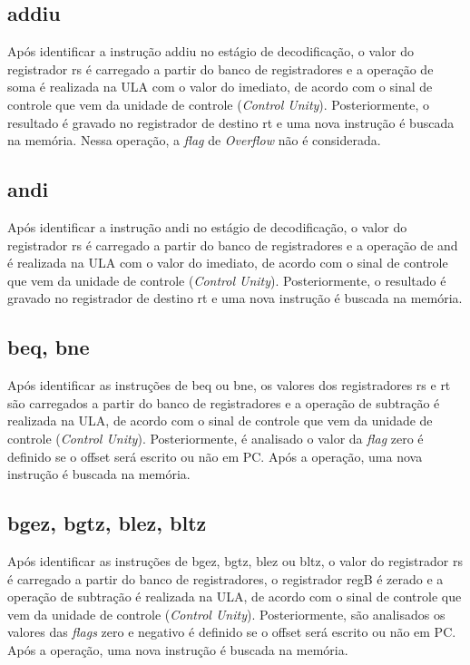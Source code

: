 \documentclass{article}
\begin{document}
    \subsection{addiu}
    Após identificar a instrução addiu no estágio de decodificação, o valor do registrador rs é carregado a partir do banco de registradores e a operação de soma é realizada na ULA com o valor do imediato, de acordo com o sinal de controle que vem da unidade de controle ({\it Control Unity}). Posteriormente, o resultado é gravado no registrador de destino rt e uma nova instrução é buscada na memória. Nessa operação, a {\it flag} de {\it Overflow} não é considerada.
    \\
    \subsection{andi}
    Após identificar a instrução andi no estágio de decodificação, o valor do registrador rs é carregado a partir do banco de registradores e a operação de and é realizada na ULA com o valor do imediato, de acordo com o sinal de controle que vem da unidade de controle ({\it Control Unity}). Posteriormente, o resultado é gravado no registrador de destino rt e uma nova instrução é buscada na memória.

    \subsection{beq, bne}
    Após identificar as instruções de beq ou bne, os valores dos registradores rs e rt são carregados a partir do banco de registradores e a operação de subtração é realizada na ULA, de acordo com o sinal de controle que vem da unidade de controle ({\it Control Unity}). Posteriormente, é analisado o valor da {\it flag} zero é definido se o offset será escrito ou não em PC. Após a operação, uma nova instrução é buscada na memória.
    \\
    \subsection{bgez, bgtz, blez, bltz}
    Após identificar as instruções de bgez, bgtz, blez ou bltz, o valor do registrador rs é carregado a partir do banco de registradores, o registrador regB é zerado e a operação de subtração é realizada na ULA, de acordo com o sinal de controle que vem da unidade de controle ({\it Control Unity}). Posteriormente, são analisados os valores das {\it flags} zero e negativo é definido se o offset será escrito ou não em PC. Após a operação, uma nova instrução é buscada na memória.
    \\
\end{document}
